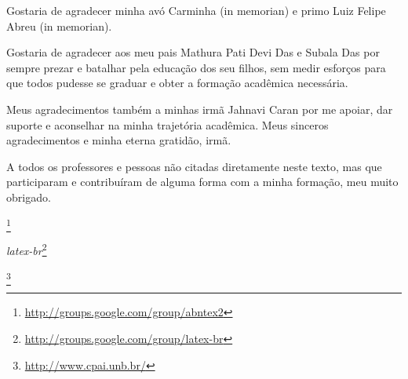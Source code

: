 \begin{agradecimentos}
	Gostaria de agradecer minha avó Carminha (in memorian) e primo Luiz Felipe Abreu (in memorian).

			Gostaria de agradecer aos meu pais Mathura Pati Devi Das e Subala Das por sempre prezar e batalhar pela educação dos seu filhos, sem medir esforços para que todos pudesse se graduar e obter a formação acadêmica necessária.

			Meus agradecimentos também a minhas irmã Jahnavi Caran por me apoiar, dar suporte e aconselhar na minha trajetória acadêmica. Meus sinceros agradecimentos e minha eterna gratidão, irmã.


			A todos os professores e pessoas não citadas diretamente neste texto, mas que participaram e contribuíram de alguma forma com a minha formação, meu muito obrigado.

	\emph{\abnTeX}\footnote{\url{http://groups.google.com/group/abntex2}}

	\emph{latex-br}\footnote{\url{http://groups.google.com/group/latex-br}} 

	\footnote{\url{http://www.cpai.unb.br/}}

\end{agradecimentos}
